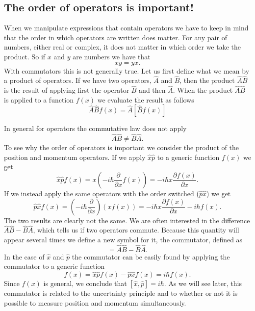 \documentclass[../Main/chem331-notes.tex]{subfiles}
\begin{document}
\subsection{The order of operators is important!}
When we manipulate expressions that contain operators we have to keep in mind that the order in which operators are written does matter.
For any pair of numbers, either real or complex, it does not matter in which order we take the product. So if $x$ and $y$ are numbers we have that
\begin{equation}
x y = y x.
\end{equation}
With commutators this is not generally true.
Let us first define what we mean by a product of operators. If we have two operators, $\hat{A}$ and $\hat{B}$, then the product $\hat{A}\hat{B}$ is the result of applying first the operator $\hat{B}$ and then $\hat{A}$. When the product $\hat{A}\hat{B}$ is applied to a function $f(x)$ we evaluate the result as follows
\begin{equation}
\hat{A}\hat{B} f(x) = \hat{A} \left[\hat{B} f(x)\right]  
\end{equation}

In general for operators the commutative law does not apply
\begin{equation}
\hat{A}\hat{B} \neq \hat{B}\hat{A}.
\end{equation}
To see why the order of operators is important we consider the product of the position and momentum operators. If we apply $\hat{x} \hat{p}$ to a generic function $f(x)$ we get
\begin{equation}
\hat{x} \hat{p} f(x) = x \left(-i\hbar \frac{\partial}{\partial x} f(x) \right)
= -i \hbar x \frac{\partial f(x)}{\partial x}.
\end{equation}
If we instead apply the same operators with the order switched ($\hat{p} \hat{x}$) we get
\begin{equation}
\hat{p} \hat{x} f(x) = \left(-i\hbar \frac{\partial}{\partial x}\right) \left(x  f(x) \right)
= -i \hbar x \frac{\partial f(x)}{\partial x} -i \hbar f(x).
\end{equation}
The two results are clearly not the same.
We are often interested in the difference $\hat{A}\hat{B} - \hat{B}\hat{A}$, which tells us if two operators commute. Because this quantity will appear several times we define a new symbol for it, the commutator, defined as
\begin{equation}
[\hat{A},\hat{B}] = \hat{A}\hat{B} - \hat{B}\hat{A}.
\end{equation}
In the case of $\hat{x}$ and $\hat{p}$ the commutator can be easily found by applying the commutator to a generic function
\begin{equation}
[\hat{x},\hat{p}] f(x) = \hat{x} \hat{p} f(x) - \hat{p} \hat{x} f(x) = i \hbar f(x).
\end{equation}
Since $f(x)$ is general, we conclude that $[\hat{x},\hat{p}] = i \hbar$.
As we will see later, this commutator is related to the uncertainty principle and to whether or not it is possible to measure position and momentum simultaneously.
\end{document}
